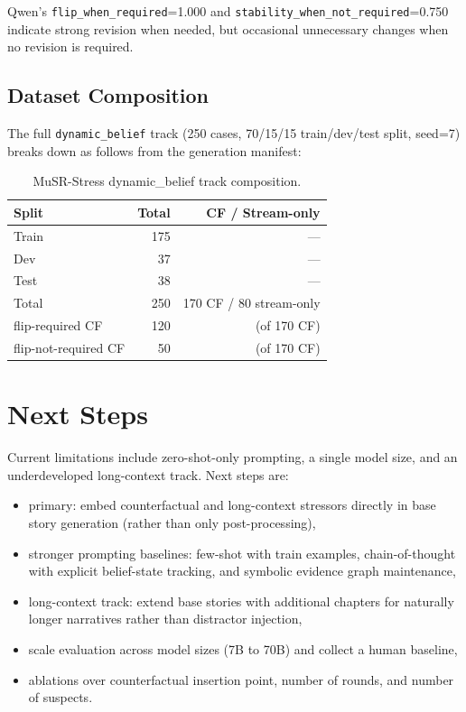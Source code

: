 \documentclass{article}
\begin{document}
Qwen's \texttt{flip\_when\_required}=1.000 and \texttt{stability\_when\_not\_required}=0.750 indicate strong revision when needed, but occasional unnecessary changes when no revision is required.

\subsection{Dataset Composition}
The full \texttt{dynamic\_belief} track (250 cases, 70/15/15 train/dev/test split, seed=7) breaks down as follows from the generation manifest:

\begin{table}[h]
\centering
\caption{MuSR-Stress dynamic\_belief track composition.}
\begin{tabular}{lrr}
\toprule
Split & Total & CF / Stream-only \\
\midrule
Train & 175 & --- \\
Dev   & 37  & --- \\
Test  & 38  & --- \\
\midrule
Total & 250 & 170 CF / 80 stream-only \\
\quad flip-required CF & 120 & (of 170 CF) \\
\quad flip-not-required CF & 50 & (of 170 CF) \\
\bottomrule
\end{tabular}
\end{table}

\section{Next Steps}
Current limitations include zero-shot-only prompting, a single model size, and an underdeveloped long-context track. Next steps are:
\begin{itemize}
  \item primary: embed counterfactual and long-context stressors directly in base story generation (rather than only post-processing),
  \item stronger prompting baselines: few-shot with train examples, chain-of-thought with explicit belief-state tracking, and symbolic evidence graph maintenance,
  \item long-context track: extend base stories with additional chapters for naturally longer narratives rather than distractor injection,
  \item scale evaluation across model sizes (7B to 70B) and collect a human baseline,
  \item ablations over counterfactual insertion point, number of rounds, and number of suspects.
\end{itemize}
\end{document}
